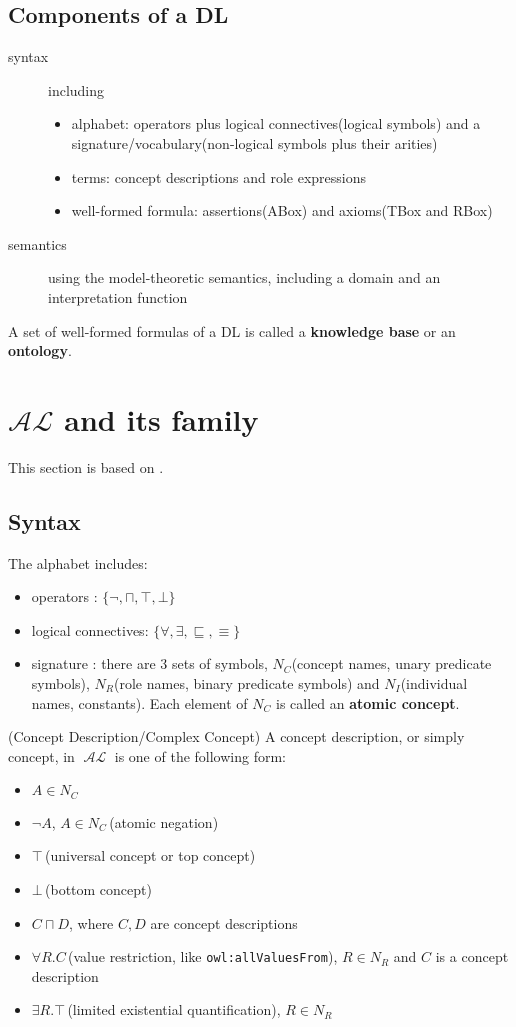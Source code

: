 \documentclass{article}
\DeclareMathOperator{\al}{\mathcal{AL}}
\begin{document}
\subsection{Components of a DL}
\begin{description}
\item[syntax] including
\begin{itemize}
\item alphabet: operators plus logical connectives(logical symbols) and a signature/vocabulary(non-logical symbols plus their arities)
\item terms: concept descriptions and role expressions
\item well-formed formula: assertions(ABox) and axioms(TBox and RBox)
\end{itemize}
\item[semantics] using the model-theoretic semantics, including a domain and an interpretation function 
\end{description}
A set of well-formed formulas of a DL is called a \textbf{knowledge base} or an \textbf{ontology}\cite{primer}.

\section{$\mathcal{AL}$ and its family}
This section is based on \cite{al}.
\subsection{Syntax}
The alphabet includes:
\begin{itemize}
\item operators : $\{ \neg ,\sqcap, \top, \bot\}$
\item logical connectives: $\{\forall, \exists, \sqsubseteq, \equiv\}$
\item signature : there are 3 sets of symbols, $N_C$(concept names, unary predicate symbols), $N_R$(role names, binary predicate symbols) and $N_I$(individual names, constants). Each element of $N_C$ is called an \textbf{atomic concept}. \newline
\end{itemize}

\begin{defin}(Concept Description/Complex Concept)\newline
A concept description, or simply concept, in $\al$ is one of the following form:
\begin{itemize}
\item $A \in N_C$
\item $\neg A$, $A \in N_C$\,({atomic negation})
\item $\top$\,(universal concept or top concept)
\item $\bot$\,(bottom concept)
\item $C \sqcap D$, where $C,D$ are concept descriptions
\item $\forall R.C$\,(value restriction, like \texttt{owl:allValuesFrom}), $R \in N_R$ and $C$ is a concept description
\item $\exists R.\top$\,(limited existential quantification), $R \in N_R$
\end{itemize}
\end{defin}
\end{document}
